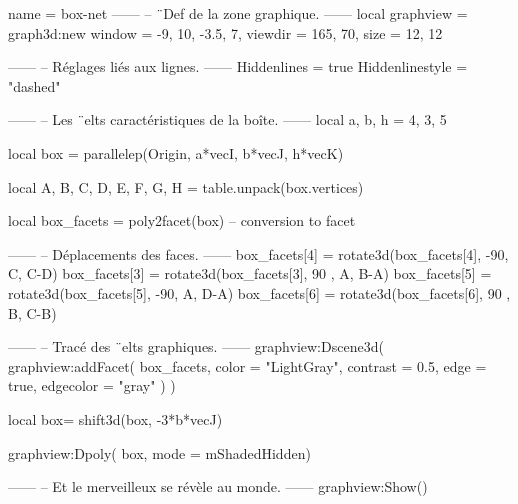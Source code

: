 \documentclass{standalone}
\begin{document}
\begin{luadraw}{name = box-net}
------
-- ¨Def de la zone graphique.
------
local graphview = graph3d:new{
  window  = {-9, 10, -3.5, 7},
  viewdir = {165, 70},
  size    = {12, 12}
}

------
-- Réglages liés aux lignes.
------
Hiddenlines = true
Hiddenlinestyle = "dashed"

------
-- Les ¨elts caractéristiques de la boîte.
------
local a, b, h = 4, 3, 5

local box = parallelep(Origin, a*vecI, b*vecJ, h*vecK)

local A, B, C, D, E, F, G, H = table.unpack(box.vertices)

local box_facets = poly2facet(box) -- conversion to facet

------
-- Déplacements des faces.
------
box_facets[4] = rotate3d(box_facets[4], -90, {C, C-D})
box_facets[3] = rotate3d(box_facets[3], 90 , {A, B-A})
box_facets[5] = rotate3d(box_facets[5], -90, {A, D-A})
box_facets[6] = rotate3d(box_facets[6], 90 , {B, C-B})

------
-- Tracé des ¨elts graphiques.
------
graphview:Dscene3d(
  graphview:addFacet(
    box_facets,
    {
      color     = "LightGray",
      contrast  = 0.5,
      edge      = true,
      edgecolor = "gray"
    })
)

local box= shift3d(box, -3*b*vecJ)

graphview:Dpoly(
    box,
    {mode = mShadedHidden})

------
-- Et le merveilleux se révèle au monde.
------
graphview:Show()
\end{luadraw}
\end{document}
